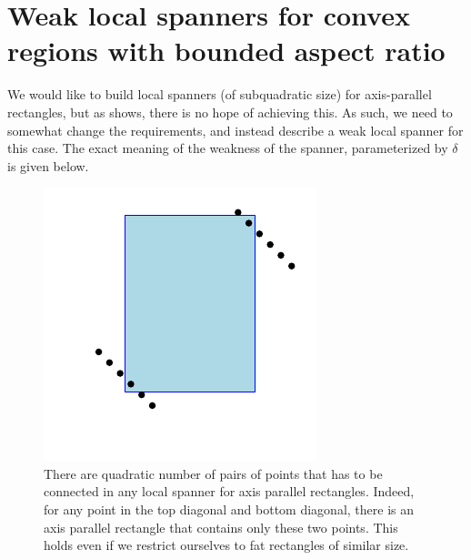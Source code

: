 \documentclass[12pt]{article}%
\begin{document}

\section{Weak local spanners for convex regions %
   with bounded aspect ratio}

We would like to build local spanners (of subquadratic size) for
axis-parallel rectangles, but as  shows, there
is no hope of achieving this. As such, we need to somewhat change the
requirements, and instead describe a weak local spanner for this case.
The exact meaning of the weakness of the spanner, parameterized by
$\delta$ is given below.

\begin{figure}
    \centerline{\includegraphics{figs/local_rectangles}}
    \caption{There are quadratic number of pairs of points that has to
       be connected in any local spanner for axis parallel
       rectangles. Indeed, for any point in the top diagonal and
       bottom diagonal, there is an axis parallel rectangle that
       contains only these two points. This holds even if we restrict
       ourselves to fat rectangles of similar size.}
\end{figure}



\end{document}
